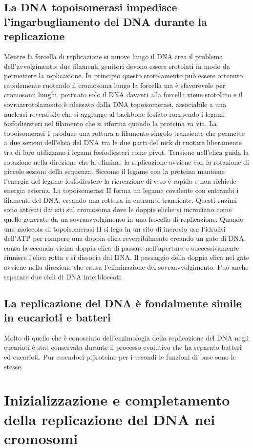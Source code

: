 \subsection{La DNA topoisomerasi impedisce l'ingarbugliamento del DNA durante la replicazione}
Mentre la forcella di replicazione si muove lungo il DNA crea il problema dell'avvolgimento: due filamenti genitori devono essere srotolati in modo da permettere la replicazione. In 
principio questo srotolamento pu\`o essere ottenuto rapidemente ruotando il cromosoma lungo la forcella ma \`e sfavorevole per cromosomi lunghi, pertnato solo il DNA davanti alla 
forcella viene srotolato e il sovraarrotolamento \`e rilassato dalla DNA topoisomerasi, associabile a una nucleasi reversibile che si aggiunge al backbone fosfato rompendo i legami
fosfodiersteri nel filamento che si riforma quando la proteina va via. La topoisomerasi 1 produce una rottura a filamento singolo transiente che permette a due sezioni dell'elica del DNA
tra le due parti del nick di ruotare liberamente tra di loro utilizzano i legami fosfodiesteri come pivot. Tensione nell'elica guida la rotazione nella direzione che la elimina: la
replicazione avviene con la rotazione di piccole sezioni della sequenza. Siccome il legame con la proteina mantiene l'energia del legame fosfodiestere la ricreazione di esso \`e rapida
e non richiede energia esterna. La topoisomerasi II forma un legame covalente con entrambi i filamenti del DNA, creando una rottura in entrambi transiente. Questi enzimi sono attivati 
dai siti sul cromosoma dove le doppie eliche si incrociano come quelle generate da un sovraavvolgimento in una frocella di replicazione. Quando una molecola di topoisomerasi II si lega 
in un sito di incrocio usa l'idrolisi dell'ATP per rompere una doppia elica reversibilmente creando un gate di DNA, causa la seconda vicina doppia elica di passare nell'apertura e 
successivamente riunisce l'elica rotta e si dissocia dal DNA. Il passaggio della doppia elica nel gate avviene nella direzione che causa l'eliminazione del sovraavvolgimento. Pu\`o 
anche separare due cicli di DNA interbloccati. 
\subsection{La replicazione del DNA \`e fondalmente simile in eucarioti e batteri}
Molto di quello che \`e conosciuto dell'enzimologia della replicazione del DNA negli eucarioti  \`e stat conservata durante il processo evolutivo che ha separato batteri ed eucarioti. 
Pur essendoci pi\u proteine per i secondi le funzioni di base sono le stesse. 
\section{Inizializzazione e completamento della replicazione del DNA nei cromosomi}

